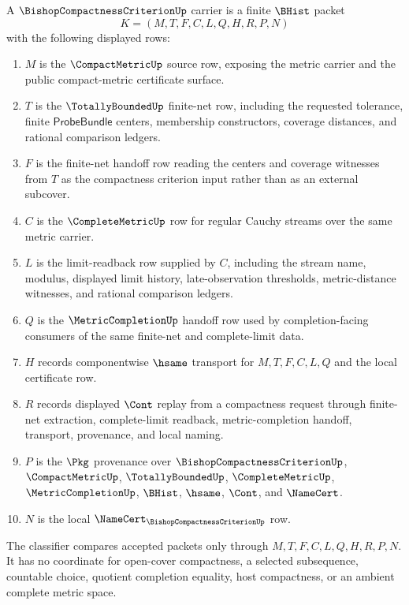 \begin{definition}
\label{def:bishop-compactness-criterion-carrier}
A $\BishopCompactnessCriterionUp$ carrier is a finite $\BHist$ packet
$$
K=(M,T,F,C,L,Q,H,R,P,N)
$$
with the following displayed rows:
\begin{enumerate}
\item $M$ is the $\CompactMetricUp$ source row, exposing the metric carrier and the public compact-metric certificate surface.
\item $T$ is the $\TotallyBoundedUp$ finite-net row, including the requested tolerance, finite $\mathsf{ProbeBundle}$ centers, membership constructors, coverage distances, and rational comparison ledgers.
\item $F$ is the finite-net handoff row reading the centers and coverage witnesses from $T$ as the compactness criterion input rather than as an external subcover.
\item $C$ is the $\CompleteMetricUp$ row for regular Cauchy streams over the same metric carrier.
\item $L$ is the limit-readback row supplied by $C$, including the stream name, modulus, displayed limit history, late-observation thresholds, metric-distance witnesses, and rational comparison ledgers.
\item $Q$ is the $\MetricCompletionUp$ handoff row used by completion-facing consumers of the same finite-net and complete-limit data.
\item $H$ records componentwise $\hsame$ transport for $M,T,F,C,L,Q$ and the local certificate row.
\item $R$ records displayed $\Cont$ replay from a compactness request through finite-net extraction, complete-limit readback, metric-completion handoff, transport, provenance, and local naming.
\item $P$ is the $\Pkg$ provenance over $\BishopCompactnessCriterionUp$, $\CompactMetricUp$, $\TotallyBoundedUp$, $\CompleteMetricUp$, $\MetricCompletionUp$, $\BHist$, $\hsame$, $\Cont$, and $\NameCert$.
\item $N$ is the local $\NameCert_{\BishopCompactnessCriterionUp}$ row.
\end{enumerate}
The classifier compares accepted packets only through $M,T,F,C,L,Q,H,R,P,N$. It has no coordinate for open-cover compactness, a selected subsequence, countable choice, quotient completion equality, host compactness, or an ambient complete metric space.
\end{definition}

